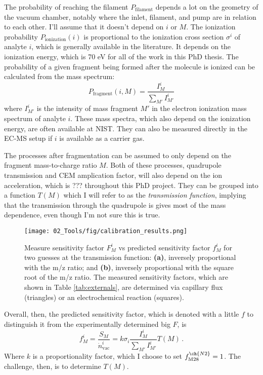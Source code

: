 The probability of reaching the filament $P_\text{filament}$ depends a lot on the geometry of the vacuum chamber, notably where the inlet, filament, and pump are in relation to each other. I'll assume that it doesn't depend on $i$ or $M$. The ionization probability $P_\text{ionization}(i)$ is proportional to the ionization cross section $\sigma^i$ of analyte $i$, which is generally available in the literature. It depends on the ionization energy, which is 70 eV for all of the work in this PhD thesis. The probability of a given fragment being formed after the molecule is ionized can be calculated from the mass spectrum:
\begin{equation}
P_\text{fragment}(i, M) = \frac{I_M^i}{\sum_{M'}I_{M'}^i}
\end{equation}
where $I_{M'}^i$ is the intensity of mass fragment $M'$ in the electron ionization mass spectrum of analyte $i$. These mass spectra, which also depend on the ionization energy, are often available at NIST\cite{NIST}. They can also be measured directly in the EC-MS setup if $i$ is available as a carrier gas. 

The processes after fragmentation can be assumed to only depend on the fragment mass-to-charge ratio $M$. Both of these processes, quadrupole transmission and CEM amplication factor, will also depend on the ion acceleration, which is {\color{red}???} throughout this PhD project. They can be grouped into a function $T(M)$ which I will refer to as the \textit{transmission function}, implying that the transmission through the quadrupole is gives most of the mass dependence, even though I'm not sure this is true.

\begin{figure}[h!]
	\texttt{[image: 02\_Tools/fig/calibration\_results.png]}
	\caption{Measure sensitivity factor $F_M^i$ vs predicted sensitivity factor $f_M^i$ for two guesses at the transmission function: \textbf{(a)}, inversely proportional with the m/z ratio; and \textbf{(b)}, inversely proportional with the square root of the m/z ratio. The measured sensitivity factors, which are shown in Table \ref{tab:externals}, are determined via capillary flux (triangles) or an electrochemical reaction (squares). }
	\label{fig:transmission}
\end{figure}

Overall, then, the predicted sensitivity factor, which is denoted with a little $f$ to distinguish it from the experimentally determined big $F$, is
\begin{equation}
f_M^i = \frac{S_M}{\dot{n}^i_\text{vac}} = k \sigma_i \frac{I_M^i}{\sum_{M'}I_{M'}^i} T(M)\,.\label{eq:rsf}
\end{equation} 
Where $k$ is a proportionality factor, which I choose to set $f_{\text{M28}}^{\ch{N2}} = 1$. The challenge, then, is to determine $T(M)$.


